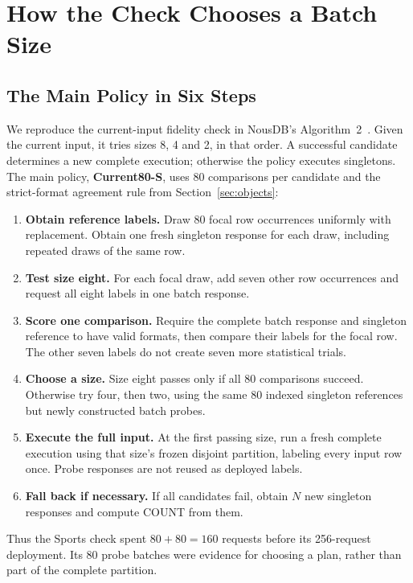 \section{How the Check Chooses a Batch Size}
\label{sec:budget}
\subsection{The Main Policy in Six Steps}
We reproduce the current-input fidelity check in NousDB's Algorithm~2~\cite{nousdb}. Given the current input, it tries sizes 8, 4 and 2, in that order. A successful candidate determines a new complete execution; otherwise the policy executes singletons. The main policy, \textbf{Current80-S}, uses 80 comparisons per candidate and the strict-format agreement rule from Section~\ref{sec:objects}:
\begin{enumerate}
\item \textbf{Obtain reference labels.} Draw 80 focal row occurrences uniformly with replacement. Obtain one fresh singleton response for each draw, including repeated draws of the same row.
\item \textbf{Test size eight.} For each focal draw, add seven other row occurrences and request all eight labels in one batch response.
\item \textbf{Score one comparison.} Require the complete batch response and singleton reference to have valid formats, then compare their labels for the focal row. The other seven labels do not create seven more statistical trials.
\item \textbf{Choose a size.} Size eight passes only if all 80 comparisons succeed. Otherwise try four, then two, using the same 80 indexed singleton references but newly constructed batch probes.
\item \textbf{Execute the full input.} At the first passing size, run a fresh complete execution using that size's frozen disjoint partition, labeling every input row once. Probe responses are not reused as deployed labels.
\item \textbf{Fall back if necessary.} If all candidates fail, obtain $N$ new singleton responses and compute COUNT from them.
\end{enumerate}
Thus the Sports check spent $80+80=160$ requests before its 256-request deployment. Its 80 probe batches were evidence for choosing a plan, rather than part of the complete partition.

